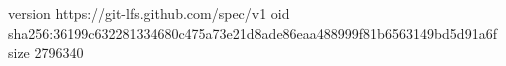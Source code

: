 version https://git-lfs.github.com/spec/v1
oid sha256:36199c632281334680c475a73e21d8ade86eaa488999f81b6563149bd5d91a6f
size 2796340
